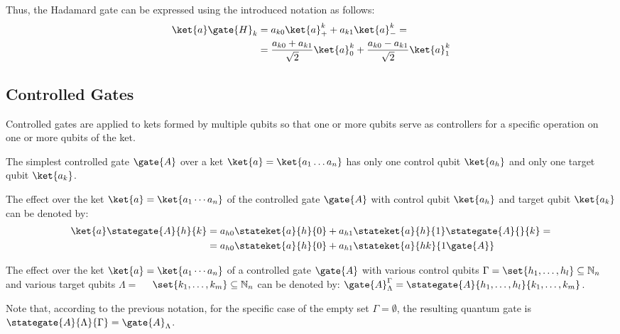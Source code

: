 \documentclass[sigconf,natbib=false]{acmart}
\begin{document}
Thus, the Hadamard gate can be expressed using the introduced notation as follows:
\begin{align}
\label{eq:hadamard}
	\ket{a}\gate{H}_k&=a_{k0}\ket{a}^{k}_{+}+a_{k1}\ket{a}^{k}_{-}=\\
&=
	\frac{a_{k0}+a_{k1}}{\sqrt{2}}\ket{a}^{k}_{0}+\frac{a_{k0}-a_{k1}}{\sqrt{2}}\ket{a}^{k}_{1}
\end{align}

\subsection{Controlled Gates}
Controlled gates are applied to kets formed by multiple qubits so that one or more qubits serve as controllers for a specific operation on one or more qubits of the ket.

The simplest controlled gate $\gate{A}$ over a ket $\ket{a}=\ket{a_1\dots a_n}$ has only one control qubit $\ket{a_h}$ and only one target qubit $\ket{a_k}$.

\begin{notation}
The effect over the  ket $\ket{a}=\ket{a_1\cdots a_n}$ of the controlled gate $\gate{A}$ with control qubit $\ket{a_h}$ and  target qubit $\ket{a_k}$ can be denoted by:
\begin{align}
\label{eq:generic-controlled-gate}
		\ket{a}\stategate{A}{h}{k}&=a_{h0}\stateket{a}{h}{0}+a_{h1} \stateket{a}{h}{1}\stategate{A}{}{k}= \\
		&=a_{h0}\stateket{a}{h}{0}+a_{h1} \stateket{a}{hk}{1\gate{A}}
\end{align}
\end{notation}

\begin{notation}
The effect over the  ket $\ket{a}=\ket{a_1\cdots a_n}$ of a controlled gate $\gate{A}$ with various control qubits $\Gamma=\set{h_1,\dots,h_l}\subseteq\mathbb{N}_n$  and various target qubits $\Lambda=$ $\text{ }$ $\set{k_1,\dots,k_m}\subseteq\mathbb{N}_n$ can be denoted by:
$\gate{A}^{\Gamma}_{\Lambda}=\stategate{A}{h_1,\dots,h_l}{k_1,\dots, k_m}$.
\end{notation}
Note that, according to the previous notation, for the specific case of the empty set $\Gamma=\emptyset$, the resulting quantum gate is $\stategate{A}{\Lambda}{\Gamma}=\gate{A}_{\Lambda}$.
\end{document}
